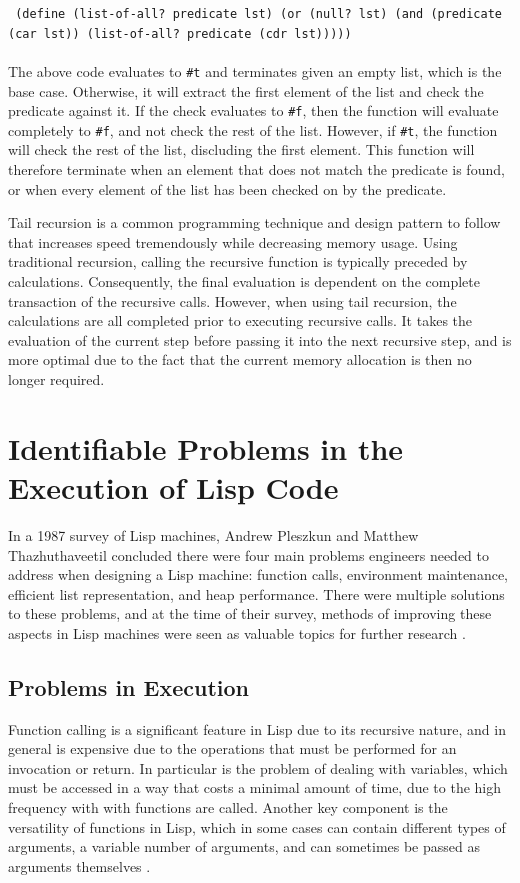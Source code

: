 \documentclass[journal]{IEEEtran}
\begin{document}
\texttt{
	(define (list-of-all? predicate lst)
			(or 
				(null? lst)
				(and (predicate (car lst))
					 (list-of-all? predicate (cdr lst)))))
}\\\\The above code evaluates to \texttt{\#t} and terminates given an empty list, which is the base case. Otherwise, it will extract the first element of the list and check the predicate against it. If the check evaluates to \texttt{\#f}, then the function will evaluate completely to \texttt{\#f}, and not check the rest of the list. However, if \texttt{\#t}, the function will check the rest of the list, discluding the first element. This function will therefore terminate when an element that does not match the predicate is found, or when every element of the list has been checked on by the predicate.

Tail recursion is a common programming technique and design pattern to follow that increases speed tremendously while decreasing memory usage. Using traditional recursion, calling the recursive function is typically preceded by calculations. Consequently, the final evaluation is dependent on the complete transaction of the recursive calls. However, when using tail recursion, the calculations are all completed prior to executing recursive calls. It takes the evaluation of the current step before passing it into the next recursive step, and is more optimal due to the fact that the current memory allocation is then no longer required.

\section{Identifiable Problems in the Execution of Lisp Code}
In a 1987 survey of Lisp machines, Andrew Pleszkun and Matthew Thazhuthaveetil concluded there were four main problems engineers needed to address when designing a Lisp machine: function calls, environment maintenance, efficient list representation, and heap performance. There were multiple solutions to these problems, and at the time of their survey, methods of improving these aspects in Lisp machines were seen as valuable topics for further research \cite{pt}.

\subsection{Problems in Execution}
Function calling is a significant feature in Lisp due to its recursive nature, and in general is expensive due to the operations that must be performed for an invocation or return. In particular is the problem of dealing with variables, which must be accessed in a way that costs a minimal amount of time, due to the high frequency with with functions are called. Another key component is the versatility of functions in Lisp, which in some cases can contain different types of arguments, a variable number of arguments, and can sometimes be passed as arguments themselves \cite{pt}.
\end{document}
